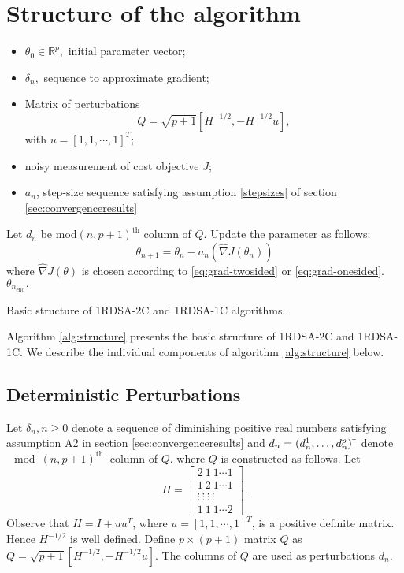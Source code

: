 \documentclass[letterpaper, 10 pt, conference]{ieeeconf}  %
\begin{document}
\section{Structure of the algorithm}
\label{sec:algo}
\begin{algorithm}[t]
\begin{algorithmic}
\begin{itemize}
 \item $\theta_0 \in \mathbb{R}^p,$ initial parameter vector;
 \item $\delta_n,$ sequence to approximate gradient;
 \item Matrix of perturbations $$Q=\sqrt{p+1}[H^{-1/2},-H^{-1/2}u],$$ 
 with $u=[1,1,\cdots,1]^T;$
 \item noisy measurement of cost objective $J$;
 \item $a_n$, step-size sequence satisfying assumption \eqref{stepsizes} of 
 section \ref{sec:convergenceresults}
\end{itemize}

	\State Let $d_n$ be mod$(n,p+1)^{\text{th}}$ column of $Q$. 
	\State Update the parameter as follows:
  \begin{equation}
  \theta_{n+1}=\theta_n-a_n(\widehat\nabla J(\theta_n)) \label{eq:algo}
  \end{equation}
where $\widehat\nabla J(\theta)$ is chosen according to \eqref{eq:grad-twosided} 
or \eqref{eq:grad-onesided}. 
\EndFor
{} $\theta_{n_{\text{end}}}.$
\end{algorithmic}
\caption{Basic structure of 1RDSA-2C and 1RDSA-1C algorithms.}
\label{alg:structure}
\end{algorithm}

Algorithm \ref{alg:structure} presents the basic structure of 
1RDSA-2C and 1RDSA-1C. We describe the individual 
components of algorithm \ref{alg:structure} below.
\subsection{Deterministic Perturbations}
Let $\delta_n, n\geq 0$ denote a sequence of diminishing positive real numbers satisfying 
assumption A2 in section \ref{sec:convergenceresults} and 
$d_n = (d_n^1,\ldots,d_n^p)^\mathsf{\scriptscriptstyle T}$ denote $\mod(n,p+1)^{\text{th }}$ column of $Q.$
where $Q$ is constructed as follows. 
Let \begin{equation*} H = \left[\begin{array}{cccc}
2 \ 1 \ 1 \cdots 1\\ 
1 \ 2 \ 1 \cdots 1 \\
\vdots \ \vdots \ \vdots \ \vdots\\
1 \ 1 \ 1 \cdots 2
\end{array}\right].
\end{equation*}
Observe that $H=I+uu^T$, where $u=[1,1,\cdots,1]^T$, is a positive definite matrix. Hence $H^{-1/2}$ is well defined.
Define $p\times (p+1)$ matrix $Q$ as $Q=\sqrt{p+1}[H^{-1/2},-H^{-1/2}u].$ The columns of
$Q$ are used as perturbations $d_n.$
\end{document}
